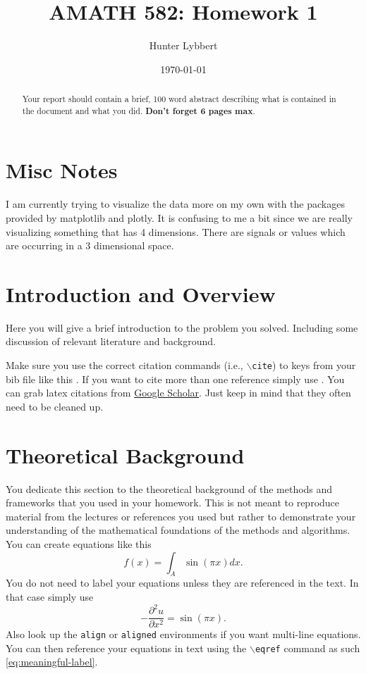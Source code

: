 \documentclass[11pt]{amsart}
\title{AMATH 582: Homework 1}
\author{Hunter Lybbert} %
\date{\today} %
\begin{document}
\maketitle

\begin{abstract}
    Your report should contain a brief, 100 word abstract describing what is contained in 
    the document and what you did. {\bf Don't forget 6 pages max}.
\end{abstract}

\section{Misc Notes}\label{sec:Notes}
I am currently trying to visualize the data more on my own with the packages provided by matplotlib and plotly.
It is confusing to me a bit since we are really visualizing something that has 4 dimensions. There are signals or values which are occurring in a 3 dimensional space.


\section{Introduction and Overview}\label{sec:Introduction}

Here you will give a brief introduction to the problem you solved. Including 
some discussion of relevant literature and background. 

Make sure you use the correct citation commands (i.e., \texttt{$\backslash$cite}) to keys 
from your bib file like this \cite{example-article-citation}. If you want 
to cite more than one reference simply use \cite{example-article-citation, example-book-citation}. You can grab latex citations 
from \href{https://scholar.google.com}{Google Scholar}. Just keep in mind that they often 
need to be cleaned up.

\section{Theoretical Background}\label{sec:theory}

You dedicate this section to the theoretical background of the methods and frameworks 
that you used in your homework. This is not meant to reproduce material from the lectures
 or references you used but rather to demonstrate your understanding of the 
 mathematical foundations of the methods and algorithms. You can create equations like this 
 \begin{equation*}
     f(x) = \int_A \sin( \pi x) dx.
 \end{equation*}
 You do not need to label your equations unless they are referenced in the text. In that 
 case simply use 
 \begin{equation}\label{eq:meaningful-label}
      - \frac{\partial^2 u}{\partial x^2} = \sin ( \pi x).
 \end{equation}
Also look up the \texttt{align} or \texttt{aligned} environments if you want multi-line 
equations. You can then reference your equations in text using the $\backslash$\texttt{eqref}
command as such \eqref{eq:meaningful-label}. 
\end{document}
